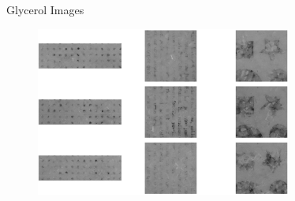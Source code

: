 \documentclass[10pt]{beamer}
\begin{document}
\begin{frame}{Glycerol Images}
\begin{figure}
    \centering
    \includegraphics[width = 0.75\textwidth]{figs/Gly_Imgs002.eps}
    \label{Glyshapes}
\end{figure}
    
\end{frame}
\end{document}
